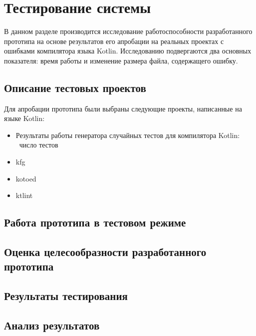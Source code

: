 \chapter{Тестирование системы}

В данном разделе производится исследование работоспособности разработанного прототипа на основе результатов его апробации на реальных проектах с ошибками компилятора языка Kotlin. Исследованию подвергаются два основных показателя: время работы и изменение размера файла, содержащего ошибку.
\section{Описание тестовых проектов}
Для апробации прототипа были выбраны следующие проекты, написанные на языке Kotlin:
\begin{itemize}
\item Результаты работы генератора случайных тестов для компилятора Kotlin: ~число тестов
\item kfg
\item kotoed
\item ktlint
\end{itemize}
\section{Работа прототипа в тестовом режиме}
\section{Оценка целесообразности разработанного прототипа}
\section{Результаты тестирования}
\section{Анализ результатов}